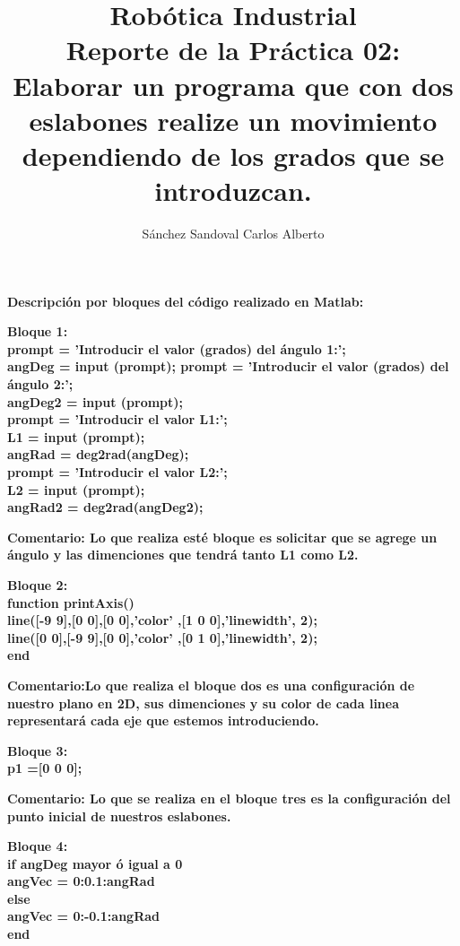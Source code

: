 \documentclass[10pt,a4paper]{article}
\author{Sánchez Sandoval Carlos Alberto}
\title{\textbf{Robótica Industrial}\\Reporte de la Práctica 02: Elaborar un programa que con dos eslabones realize un movimiento dependiendo de los grados que se introduzcan.}
\begin{document}
\maketitle

\begin{flushleft}
\textbf{Descripción por bloques del código realizado en Matlab:}
\end{flushleft}

\begin{flushleft}
\textbf{Bloque 1:\\
prompt = 'Introducir el valor (grados) del ángulo 1:';\\
angDeg = input (prompt);
prompt = 'Introducir el valor (grados) del ángulo 2:';\\
angDeg2 = input (prompt);\\
prompt = 'Introducir el valor L1:';\\
L1 = input (prompt);\\
angRad = deg2rad(angDeg);\\
prompt = 'Introducir el valor L2:';\\
L2 = input (prompt);\\
angRad2 = deg2rad(angDeg2);\\}
\end{flushleft}

\begin{flushleft}
\textbf{Comentario: Lo que realiza esté bloque es solicitar que se agrege un ángulo y las dimenciones que tendrá tanto L1 como L2.}
\end{flushleft}

\begin{flushleft}
\textbf{Bloque 2:\\
function printAxis()\\
line([-9 9],[0 0],[0 0],'color' ,[1 0 0],'linewidth', 2);\\
line([0 0],[-9 9],[0 0],'color' ,[0 1 0],'linewidth', 2);\\
end}
\end{flushleft}
\begin{flushleft}
\textbf{Comentario:Lo que realiza el bloque dos es una configuración de nuestro plano en 2D, sus dimenciones y su color de cada linea representará cada eje que estemos introduciendo.}
\end{flushleft}

\begin{flushleft}
\textbf{Bloque 3:\\
p1 =[0 0 0];}
\end{flushleft}
\begin{flushleft}
\textbf{Comentario: Lo que se realiza en el bloque tres es la configuración del punto inicial de nuestros eslabones.}
\end{flushleft}
\begin{flushleft}
\textbf{Bloque 4:\\
if angDeg mayor \'o igual a 0\\
    angVec = 0:0.1:angRad\\
else\\
    angVec = 0:-0.1:angRad\\
end
}
\end{flushleft}
\end{document}
